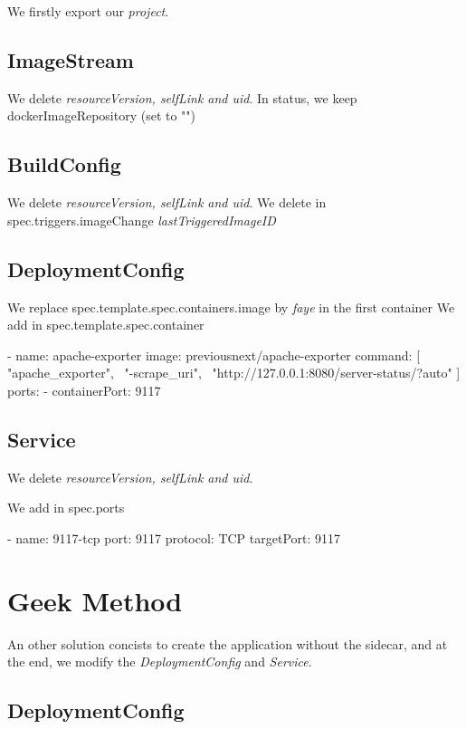 We firstly export our \emph{project}.


\subsection{ImageStream}
We delete \emph{resourceVersion, selfLink and uid}. In status, we keep dockerImageRepository (set to "")

\subsection{BuildConfig}
We delete \emph{resourceVersion, selfLink and uid}. We delete in spec.triggers.imageChange \emph{lastTriggeredImageID}

\subsection{DeploymentConfig}
We replace spec.template.spec.containers.image by \emph{faye} in the first container
We add in spec.template.spec.container

\begin{bashcode}
  - name: apache-exporter
  image: previousnext/apache-exporter
  command: [ "apache_exporter", \
  "-scrape_uri", \
  "http://127.0.0.1:8080/server-status/?auto" ]
  ports:
  - containerPort: 9117
\end{bashcode}

\subsection{Service}
We delete \emph{resourceVersion, selfLink and uid}.

We add in spec.ports

\begin{bashcode}
  - name: 9117-tcp
  port: 9117
  protocol: TCP
  targetPort: 9117
\end{bashcode}

\section{Geek Method}
An other solution concists to create the application without the sidecar, and at the end, we modify the \emph{DeploymentConfig} and \emph{Service}.

\subsection{DeploymentConfig}

